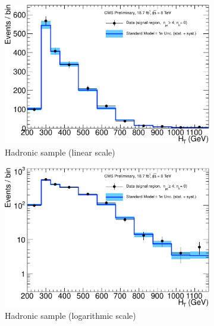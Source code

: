 \clearpage
\begin{figure}[h!]
  \centering
  \begin{subfigure}[b]{0.48\textwidth}
    \includegraphics[width=\textwidth]
    {Figs/results/v0/blueBand/single_plots/hadronic_0b_ge4j.pdf}
    \caption{Hadronic sample (linear scale)}
  \end{subfigure}
  \vspace{0.7cm}\begin{subfigure}[b]{0.48\textwidth}
    \includegraphics[width=\textwidth]
    {Figs/results/v0/blueBand/single_plots/hadronic_0b_ge4j_logy.pdf}
    \caption{Hadronic sample (logarithmic scale)}
  \end{subfigure}
  \begin{subfigure}[b]{0.48\textwidth}

\end{subfigure}
\end{figure}
